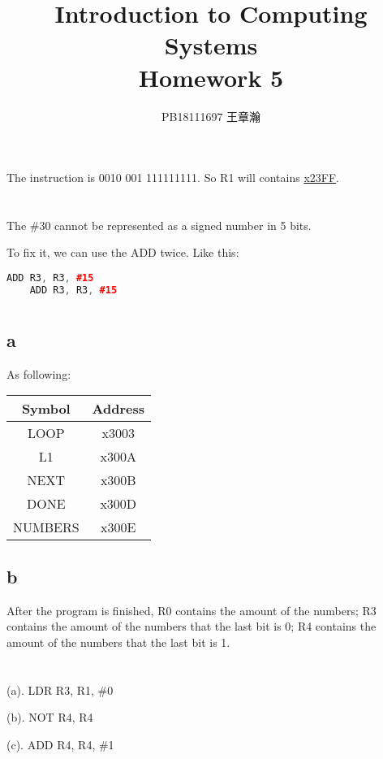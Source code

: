 \documentclass[11pt,a4paper]{article}
\title{Introduction to Computing Systems\\Homework 5}
\author{PB18111697 王章瀚}
\newcommand{\jumpLine} {\hspace*{\fill} \par}
\begin{document}
	\maketitle
	\section{}
	The instruction is 0010 001 111111111. So R1 will contains \underline{x23FF}.
	
	\section{}
	The \#30 cannot be represented as a signed number in 5 bits.\par
	To fix it, we can use the ADD twice. Like this: \par
	\begin{lstlisting}[language=C++]
	ADD	R3, R3, #15
	ADD	R3, R3, #15
	\end{lstlisting}
	
	\section{}
	\subsection*{a}
	As following:\par
	\begin{tabular}{|c|c|}
		\hline 
		Symbol & Address \\ 
		\hline 
		LOOP & x3003 \\ 
		\hline 
		L1 & x300A \\ 
		\hline 
		NEXT & x300B \\ 
		\hline 
		DONE & x300D \\ 
		\hline 
		NUMBERS & x300E \\ 
		\hline 
	\end{tabular} 
	\subsection*{b}
	After the program is finished, R0 contains the amount of the numbers; R3 contains the amount of the numbers that the last bit is 0; R4 contains the amount of the numbers that the last bit is 1.\par
	
	\section{}
	\jumpLine
	(a). LDR R3, R1, \#0\par
	(b). NOT R4, R4\par
	(c). ADD R4, R4, \#1\par
	
\end{document}
